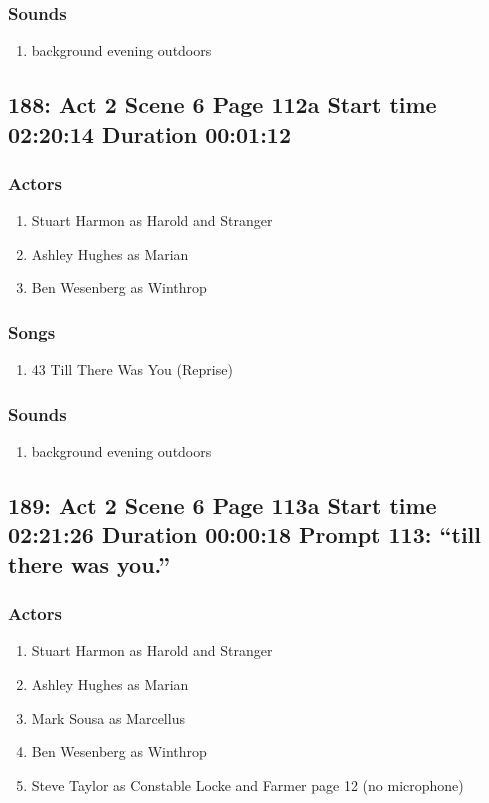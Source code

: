 \subsubsection{Sounds}
\begin{enumerate}
\item background evening outdoors
\end{enumerate}
\subsection{188: Act 2 Scene 6 Page 112a Start time 02:20:14 Duration 00:01:12}

\subsubsection{Actors}
\begin{enumerate}
\item Stuart Harmon as Harold and Stranger
\item Ashley Hughes as Marian
\item Ben Wesenberg as Winthrop
\end{enumerate}

\subsubsection{Songs}
\begin{enumerate}
\item 43 Till There Was You (Reprise)
\end{enumerate}\subsubsection{Sounds}
\begin{enumerate}
\item background evening outdoors
\end{enumerate}
\subsection{189: Act 2 Scene 6 Page 113a Start time 02:21:26 Duration 00:00:18 Prompt 113: ``till there was you.''}

\subsubsection{Actors}
\begin{enumerate}
\item Stuart Harmon as Harold and Stranger
\item Ashley Hughes as Marian
\item Mark Sousa as Marcellus
\item Ben Wesenberg as Winthrop
\item Steve Taylor as Constable Locke and Farmer page 12 (no microphone)
\end{enumerate}

